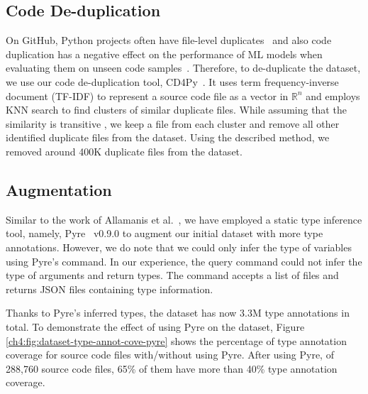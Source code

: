 \subsection{Code De-duplication}
On GitHub, Python projects often have file-level duplicates~\cite{lopes2017dejavu} and also code duplication has a negative effect on the performance of ML models when evaluating them on unseen code samples~\cite{allamanis2018adverse}. Therefore, to de-duplicate the dataset, we use our code de-duplication tool, CD4Py~\cite{cd4py}. It uses term frequency-inverse document (TF-IDF) \cite{manning2008introduction} to represent a source code file as a vector in $\mathbb{R}^{n}$ and employs KNN search to find clusters of similar duplicate files. While assuming that the similarity is transitive \cite{allamanis2018adverse}, we keep a file from each cluster and remove all other identified duplicate files from the dataset. Using the described method, we removed around 400K duplicate files from the dataset.

\subsection{Augmentation}
Similar to the work of Allamanis et al.~\cite{allamanis2020typilus}, we have employed a static type inference tool, namely, Pyre~\cite{pyre} v0.9.0 to augment our initial dataset with more type annotations. However, we do note that we could only infer the type of variables using Pyre's  command. In our experience, the query command could not infer the type of arguments and return types. The command accepts a list of files and returns JSON files containing type information.

Thanks to Pyre's inferred types, the dataset has now 3.3M type annotations in total. To demonstrate the effect of using Pyre on the dataset, Figure \ref{ch4:fig:dataset-type-annot-cove-pyre} shows the percentage of type annotation coverage for source code files with/without using Pyre. After using Pyre, of 288,760 source code files, 65\% of them have more than 40\% type annotation coverage.

